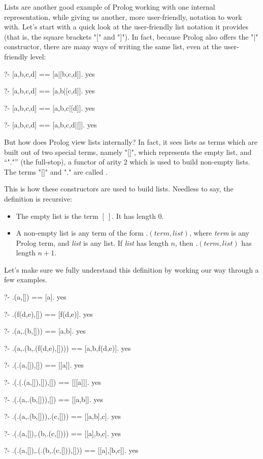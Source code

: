 Lists are another good example of Prolog working with one internal
representation, while giving us another, more user-friendly, notation
to work with.  Let's start with a quick look at the user-friendly list
notation it provides (that is, the square brackets "[" and "]").  In
fact, because Prolog also offers the "|" constructor, there are
many ways of writing the same list, even at the user-friendly level:

\begin{LPNcodedisplay}
?- [a,b,c,d] == [a|[b,c,d]].
yes

?- [a,b,c,d] == [a,b|[c,d]].
yes

?- [a,b,c,d] == [a,b,c|[d]].
yes

?- [a,b,c,d] == [a,b,c,d|[]].
yes
\end{LPNcodedisplay}



But how does Prolog view lists internally?  In fact, it sees lists as
terms which are built out of two special terms, namely "[]", which
represents the empty list, and ``"."'' (the full-stop), a functor
of arity 2 which is used to build
non-empty lists. The terms "[]" and "." are called .

This is how these constructors are used to build lists.  Needless to
say, the definition is recursive:

\begin{itemize}
\item{}The empty list is the term $[ \ ]$. It
        has length 0.
\item{}A non-empty list is any term of the form $.(\textit{term},\textit{list})$,
        where \textit{term} is any Prolog term, and \textit{list} is any
        list.  If \textit{list} has length $n$, then $.(\textit{term},\textit{list})$ has
        length $n+1$.
\end{itemize}

Let's make sure we fully understand this definition by working our way
through a few examples.


\begin{LPNcodedisplay}
?- .(a,[]) == [a].
yes

?- .(f(d,e),[]) == [f(d,e)].
yes

?- .(a,.(b,[])) == [a,b].
yes

?- .(a,.(b,.(f(d,e),[]))) == [a,b,f(d,e)].
yes

?- .(.(a,[]),[]) == [[a]].
yes

?- .(.(.(a,[]),[]),[]) == [[[a]]].
yes

?- .(.(a,.(b,[])),[]) == [[a,b]].
yes

?- .(.(a,.(b,[])),.(c,[])) == [[a,b],c].
yes

?- .(.(a,[]),.(b,.(c,[]))) == [[a],b,c].
yes

?- .(.(a,[]),.(.(b,.(c,[])),[])) == [[a],[b,c]].
yes
\end{LPNcodedisplay}


